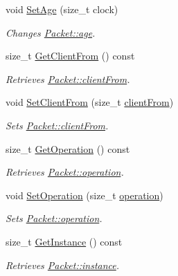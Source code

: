 \begin{DoxyCompactItemize}
void \hyperlink{class_packet_a8ac622b3f32dd436e4fdaf345459a401}{SetAge} (size\_\-t clock)
\begin{DoxyCompactList}\small\item\em Changes \hyperlink{class_packet_af82113a0e0b36819fcbe4b8245db579e}{Packet::age}. \item\end{DoxyCompactList}\item 
size\_\-t \hyperlink{class_packet_adc3e10f8e3b90b281e524a08bb935a43}{GetClientFrom} () const 
\begin{DoxyCompactList}\small\item\em Retrieves \hyperlink{class_packet_ae3b05f3a3a910c466caa042f5b6961dd}{Packet::clientFrom}. \item\end{DoxyCompactList}\item 
void \hyperlink{class_packet_a74b80d681488bffc70bcc6d6ba368e71}{SetClientFrom} (size\_\-t \hyperlink{class_packet_ae3b05f3a3a910c466caa042f5b6961dd}{clientFrom})
\begin{DoxyCompactList}\small\item\em Sets \hyperlink{class_packet_ae3b05f3a3a910c466caa042f5b6961dd}{Packet::clientFrom}. \item\end{DoxyCompactList}\item 
size\_\-t \hyperlink{class_packet_a557e791794531dd1642e352253ff0262}{GetOperation} () const 
\begin{DoxyCompactList}\small\item\em Retrieves \hyperlink{class_packet_a03920d292b5acc0f9223f6364d663001}{Packet::operation}. \item\end{DoxyCompactList}\item 
void \hyperlink{class_packet_a84ea3a060f4063fd2a7496643b7f2495}{SetOperation} (size\_\-t \hyperlink{class_packet_a03920d292b5acc0f9223f6364d663001}{operation})
\begin{DoxyCompactList}\small\item\em Sets \hyperlink{class_packet_a03920d292b5acc0f9223f6364d663001}{Packet::operation}. \item\end{DoxyCompactList}\item 
size\_\-t \hyperlink{class_packet_a7ea59cb087fd573b502f294662f3be43}{GetInstance} () const 
\begin{DoxyCompactList}\small\item\em Retrieves \hyperlink{class_packet_afce0ae0cb900f81df3cb1aaa2d197495}{Packet::instance}. \item\end{DoxyCompactList}\item 

\end{DoxyCompactItemize}
